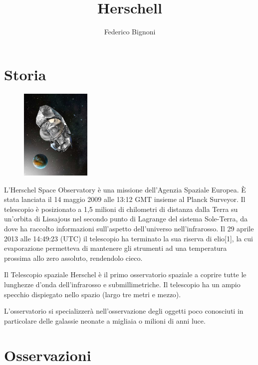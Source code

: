 \documentclass[12pt,a4paper]{article}
\begin{document}
\title{\vspace{-70pt}Herschell}
\author{Federico Bignoni}
\date{}
\maketitle
\pagestyle{empty}
\thispagestyle{empty}

\section*{Storia}
\label{storia}
\begin{figure}
  \vspace{-10pt}
  \begin{center}
    \includegraphics[width=0.30\textwidth]{satellite}
  \end{center}
  \vspace{-20pt}
\end{figure}
L'Herschel Space Observatory è una missione dell'Agenzia Spaziale Europea.
È stata lanciata il 14 maggio 2009 alle 13:12 GMT insieme al Planck Surveyor.
Il telescopio è posizionato a 1,5 milioni di chilometri di distanza dalla Terra su un'orbita di Lissajous nel secondo punto di Lagrange del sistema Sole-Terra, da dove ha raccolto informazioni sull'aspetto dell'universo nell'infrarosso. Il 29 aprile 2013 alle 14:49:23 (UTC) il telescopio ha terminato la sua riserva di elio[1], la cui evaporazione permetteva di mantenere gli strumenti ad una temperatura prossima allo zero assoluto, rendendolo cieco.

Il Telescopio spaziale Herschel è il primo osservatorio spaziale a coprire tutte le lunghezze d'onda dell'infrarosso e submillimetriche. Il telescopio ha un ampio specchio dispiegato nello spazio (largo tre metri e mezzo).

L'osservatorio si specializzerà nell'osservazione degli oggetti poco conosciuti in particolare delle galassie neonate a migliaia o milioni di anni luce.

\section{Osservazioni}
\label{osservazioni}
\end{document}
